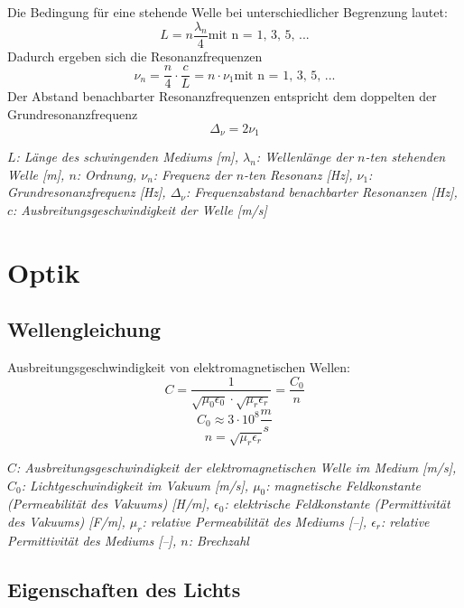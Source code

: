 \documentclass[a4paper,10pt]{article}
\newenvironment{displayformula}
{
	\begin{framed}
		\color{formulaColor}
	}
	{\end{framed}}
\newcommand{\formulalegend}[1]{%
	\par\vspace{0.5ex}%
	{{\color{legendColor}\RaggedRight\small\textit{#1}}}%
	\par\vspace{1.5ex}%
}
\begin{document}
\begin{displayformula}
	Die Bedingung für eine stehende Welle bei unterschiedlicher Begrenzung lautet:
	\[
	L = n\frac{\lambda_n}{4} \text{mit n = 1, 3, 5, ...}
	\]
	Dadurch ergeben sich die Resonanzfrequenzen
	\[
	\nu_n = \frac{n}{4} \cdot \frac{c}{L} = n \cdot \nu_1 \text{mit n = 1, 3, 5, ...}
	\]
	Der Abstand benachbarter Resonanzfrequenzen entspricht dem doppelten der Grundresonanzfrequenz
	\[
	\Delta_\nu = 2\nu_1
	\]
\end{displayformula}
\formulalegend{
	\( L \): Länge des schwingenden Mediums [m], 
	\( \lambda_n \): Wellenlänge der \(n\)-ten stehenden Welle [m], 
	\( n \): Ordnung, 
	\( \nu_n \): Frequenz der \(n\)-ten Resonanz [Hz], 
	\( \nu_1 \): Grundresonanzfrequenz [Hz], 
	\( \Delta_\nu \): Frequenzabstand benachbarter Resonanzen [Hz], 
	\( c \): Ausbreitungsgeschwindigkeit der Welle [m/s]
}


\section{Optik}

\subsection{Wellengleichung}

\begin{displayformula}
	Ausbreitungsgeschwindigkeit von elektromagnetischen Wellen:
	\[
	C = \frac{1}{\sqrt{\mu_0 \epsilon_0} \cdot \sqrt{\mu_r \epsilon_r}} = \frac{C_0}{n}
	\]
	\[
	C_0 \approx 3 \cdot 10^8 \frac{m}{s}
	\]
	\[
	n = \sqrt{\mu_r \epsilon_r}
	\]
\end{displayformula}
\formulalegend{
	\( C \): Ausbreitungsgeschwindigkeit der elektromagnetischen Welle im Medium [m/s], 
	\( C_0 \): Lichtgeschwindigkeit im Vakuum [m/s], 
	\( \mu_0 \): magnetische Feldkonstante (Permeabilität des Vakuums) [H/m], 
	\( \epsilon_0 \): elektrische Feldkonstante (Permittivität des Vakuums) [F/m], 
	\( \mu_r \): relative Permeabilität des Mediums [–], 
	\( \epsilon_r \): relative Permittivität des Mediums [–], 
	\( n \): Brechzahl
}


\subsection{Eigenschaften des Lichts}
\end{document}
